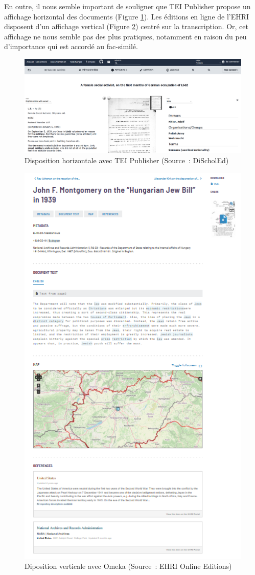 En outre, il nous semble important de souligner que TEI Publisher propose un affichage horizontal des documents (Figure \ref{fig:doc-teipublisher}). Les éditions en ligne de l'EHRI disposent d'un affichage vertical (Figure \ref{fig:ehri-omeka}) centré sur la transcription. Or, cet affichage ne nous semble pas des plus pratiques, notamment en raison du peu d'importance qui est accordé au fac-similé.  

\begin{figure}[!h]
    \centering
    \includegraphics[width=\linewidth]{2-MAIN/images/discholed-document.png}
    \caption{Disposition horizontale avec TEI Publisher (Source~: DiScholEd)}
    \label{fig:doc-teipublisher}
\end{figure}

\begin{figure}[h]
    \centering
    \includegraphics{2-MAIN/images/ehri-omeka.png}
    \caption{Diposition verticale avec Omeka (Source~: EHRI Online Editions)}
    \label{fig:ehri-omeka}
\end{figure}